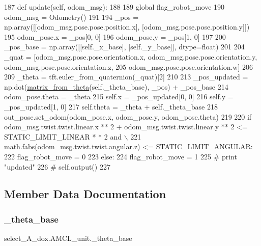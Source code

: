 \begin{DoxyCode}
187     \textcolor{keyword}{def }update(self, odom\_msg):
188 
189         \textcolor{keyword}{global} flag\_robot\_move
190         odom\_msg = Odometry()
191         
194         \_pos = np.array([[odom\_msg.pose.pose.position.x], [odom\_msg.pose.pose.position.y]])
195         odom\_pose.x = \_pos[0, 0]
196         odom\_pose.y = \_pos[1, 0]
197         
200         \_pos\_base = np.array([[self.\_x\_base], [self.\_y\_base]], dtype=float)
201         
204         \_quat = [odom\_msg.pose.pose.orientation.x, odom\_msg.pose.pose.orientation.y, 
      odom\_msg.pose.pose.orientation.z,
205                  odom\_msg.pose.pose.orientation.w]
206         
209         \_theta = tft.euler\_from\_quaternion(\_quat)[2]
210         
213         \_pos\_updated = np.dot(\hyperlink{namespaceselect___a__dox_aeb9ae60d7e093e9212176c74ab48f697}{matrix\_from\_theta}(self.\_theta\_base), \_pos) + \_pos\_base
214         odom\_pose.theta = \_theta
215         self.x = \_pos\_updated[0, 0]
216         self.y = \_pos\_updated[1, 0]
217         self.theta = \_theta + self.\_theta\_base
218         out\_pose.set\_odom(odom\_pose.x, odom\_pose.y, odom\_pose.theta)
219 
220         \textcolor{keywordflow}{if} odom\_msg.twist.twist.linear.x ** 2 + odom\_msg.twist.twist.linear.y ** 2 <= STATIC\_LIMIT\_LINEAR *
      * 2 \textcolor{keywordflow}{and} \(\backslash\)
221                 math.fabs(odom\_msg.twist.twist.angular.z) <= STATIC\_LIMIT\_ANGULAR:
222             flag\_robot\_move = 0
223         \textcolor{keywordflow}{else}:
224             flag\_robot\_move = 1
225         \textcolor{comment}{# print "updated"}
226         \textcolor{comment}{# self.output()}
227 
\end{DoxyCode}


\subsection{Member Data Documentation}
\mbox{\label{classselect___a__dox_1_1_a_m_c_l__unit_a827a570aad16f5ea7d96c8fcadc7f7f8}} 
\subsubsection{\texorpdfstring{\+\_\+theta\+\_\+base}{\_theta\_base}}
{\footnotesize\ttfamily select\+\_\+\+A\+\_\+dox.\+A\+M\+C\+L\+\_\+unit.\+\_\+theta\+\_\+base\hspace{0.3cm}{\ttfamily [private]}}



